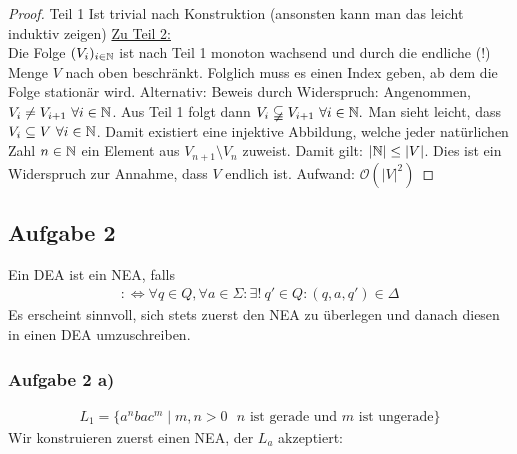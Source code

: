 \begin{proof}
	Teil 1 Ist trivial nach Konstruktion (ansonsten kann man das leicht induktiv zeigen)\nl
	\ul{Zu Teil 2:}\\
	Die Folge $(V_i)_{i\in\mathbb{N}}$ ist nach Teil 1 monoton wachsend und durch die endliche (!) Menge $V$ nach oben beschränkt. 
	Folglich muss es einen Index geben, ab dem die Folge stationär wird.\nl
	Alternativ: Beweis durch Widerspruch: Angenommen, $V_i\neq V_{i+1}~\forall i\in\mathbb{N}$. 
	Aus Teil 1 folgt dann $V_i\varsubsetneqq V_{i+1}~\forall i\in\mathbb{N}.$ 
	Man sieht leicht, dass $V_i\subseteq V~\forall i\in\mathbb{N}$. 
	Damit existiert eine injektive Abbildung, welche jeder natürlichen Zahl $n\in\mathbb{N}$ ein Element aus $V_{n+1}\setminus V_n$ zuweist. 
	Damit gilt: $|\mathbb{N}|\leq |V|$. Dies ist ein Widerspruch zur Annahme, dass $V$ endlich ist.\nl
	Aufwand: $\mathcal{O}(|V|^2)$ %
\end{proof}

\subsection{Aufgabe 2}
Ein DEA ist ein NEA, falls
\begin{align*}
	:\Longleftrightarrow\forall q\in Q,\forall a\in\Sigma:\exists!~q'\in Q:(q,a,q')\in\Delta
\end{align*}
Es erscheint sinnvoll, sich stets zuerst den NEA zu überlegen und danach diesen in einen DEA umzuschreiben.

\subsubsection{Aufgabe 2 a)}
\begin{align*}
	L_1=\big\lbrace a^n bac^m\mid m,n>0\text{ $n$ ist gerade und $m$ ist ungerade}\big\rbrace
\end{align*}
Wir konstruieren zuerst einen NEA, der $L_a$ akzeptiert:


